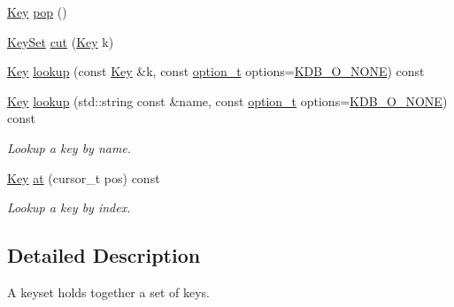 \begin{DoxyCompactItemize}
\hyperlink{classkdb_1_1Key}{Key} \hyperlink{classkdb_1_1KeySet_a7f207457a1c12633a1a5301a3a1bbaed}{pop} ()
\begin{DoxyCompactList}\small\item\em \end{DoxyCompactList}\item 
\hyperlink{classkdb_1_1KeySet}{Key\-Set} \hyperlink{classkdb_1_1KeySet_ab283da798a7670d5c3f0e1a5b821e666}{cut} (\hyperlink{classkdb_1_1Key}{Key} k)
\begin{DoxyCompactList}\small\item\em \end{DoxyCompactList}\item 
\hyperlink{classkdb_1_1Key}{Key} \hyperlink{classkdb_1_1KeySet_a816e7468abe296f8352e090738c215cc}{lookup} (const \hyperlink{classkdb_1_1Key}{Key} \&k, const \hyperlink{group__kdb_ga98a3d6a4016c9dad9cbd1a99a9c2a45a}{option\-\_\-t} options=\hyperlink{group__kdb_gga98a3d6a4016c9dad9cbd1a99a9c2a45aa00738455e0ae843c8720809d8287f370}{K\-D\-B\-\_\-\-O\-\_\-\-N\-O\-N\-E}) const 
\begin{DoxyCompactList}\small\item\em \end{DoxyCompactList}\item 
\hyperlink{classkdb_1_1Key}{Key} \hyperlink{classkdb_1_1KeySet_a2bb4b6f5c46eb54c4f495832672e1e98}{lookup} (std\-::string const \&name, const \hyperlink{group__kdb_ga98a3d6a4016c9dad9cbd1a99a9c2a45a}{option\-\_\-t} options=\hyperlink{group__kdb_gga98a3d6a4016c9dad9cbd1a99a9c2a45aa00738455e0ae843c8720809d8287f370}{K\-D\-B\-\_\-\-O\-\_\-\-N\-O\-N\-E}) const 
\begin{DoxyCompactList}\small\item\em Lookup a key by name. \end{DoxyCompactList}\item 
\hyperlink{classkdb_1_1Key}{Key} \hyperlink{classkdb_1_1KeySet_ad4aa72767cf702066e804ef054fc7e5b}{at} (cursor\-\_\-t pos) const 
\begin{DoxyCompactList}\small\item\em Lookup a key by index. \end{DoxyCompactList}\end{DoxyCompactItemize}


\subsection{Detailed Description}
A keyset holds together a set of keys. 

